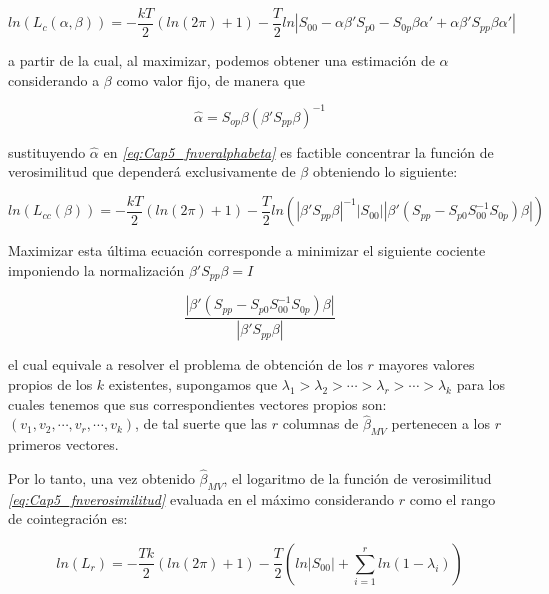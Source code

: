  \begin{equation} \label{eq:Cap5_fnveralphabeta}
 ln(L_c(\alpha,\beta))= -\frac{kT}{2}(ln(2\pi)+1)-\frac{T}{2}ln\left | S_{00}-\alpha \beta' S_{p0} -S_{0p}\beta \alpha' + \alpha\beta'S_{pp}\beta\alpha' \right |
 \end{equation}
  
 a partir de la cual, al maximizar,  podemos obtener una estimación de $\alpha$ considerando a $\beta$ como valor fijo, de manera que 
 
 \begin{equation}
 \widehat{\alpha}= S_{op}\beta(\beta'S_{pp}\beta)^{-1}
 \end{equation} 
 
 sustituyendo $\widehat{\alpha}$ en \textit{\ref{eq:Cap5_fnveralphabeta}} es factible concentrar la función de verosimilitud que dependerá exclusivamente de $\beta$ obteniendo lo siguiente:
 
 \begin{equation}
 ln(L_{cc}(\beta))= -\frac{kT}{2}(ln(2\pi)+1)-\frac{T}{2}ln\left ( \left | \beta'S_{pp}\beta \right |^{-1} \left | S_{00} \right |\left | \beta'\left ( S_{pp}-S_{p0}S_{00}^{-1}S_{0p} \right )\beta \right | \right )
 \end{equation}
 
 Maximizar esta última ecuación corresponde a minimizar el siguiente cociente imponiendo la normalización $ \beta'S_{pp}\beta=I$
  
\begin{equation}\label{eq:Cap5_maximover}
\frac{\left | \beta'\left ( S_{pp}-S_{p0}S_{00}^{-1}S_{0p} \right )\beta \right |}{\left | \beta'S_{pp}\beta \right |}
\end{equation}

el cual equivale a resolver el problema de obtención de los $r$ mayores valores propios de los  $k$ existentes, supongamos que $\lambda_1>\lambda_2>\cdots>\lambda_r>\cdots>\lambda_k$ para los cuales tenemos que sus correspondientes vectores propios son: $(v_1,v_2,\cdots, v_r, \cdots, v_k)$, de tal suerte que las $r$ columnas de $\widehat{\beta}_{MV}$ pertenecen a los $r$ primeros vectores.\bigskip 

Por lo tanto, una vez obtenido $\widehat{\beta}_{MV}$, el logaritmo de la  función de verosimilitud \textit{\ref{eq:Cap5_fnverosimilitud}} evaluada en el máximo considerando $r$ como el rango de cointegración  es:

\begin{equation} \label{eq:Cap5_maximofnver}
ln(L_r)=-\frac{Tk}{2}\left ( ln(2\pi)+1 \right )-\frac{T}{2}\left ( ln\left | S_{00} \right |+ \sum_{i=1}^rln(1-\lambda_i) \right )
\end{equation}

